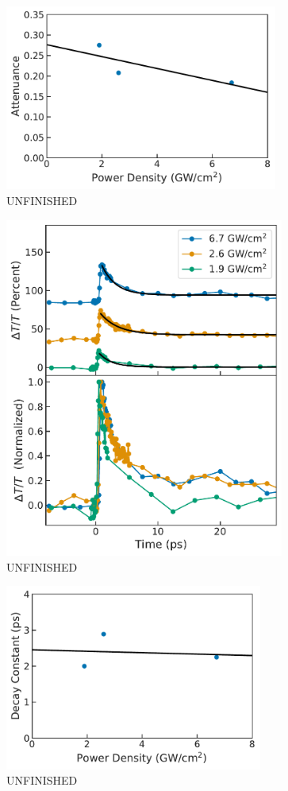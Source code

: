 \begin{figure}[ht]
	\centering
	\includegraphics[height=2.4in]{images/chapter_my_data/Jan_CNT_max_attenuance_and_fit}
	\caption{{\color{red} UNFINISHED}}
\end{figure}

\begin{figure}[ht]
	\centering
	\includegraphics[height=4.4in]{images/chapter_my_data/Jan_CNT_diff_trans_fits_and_normalized}
	\caption{{\color{red} UNFINISHED}}
\end{figure}

\begin{figure}[ht]
	\centering
	\includegraphics[height=2.4in]{images/chapter_my_data/Jan_CNT_decay_const_fit}
	\caption{{\color{red} UNFINISHED}}
\end{figure}

